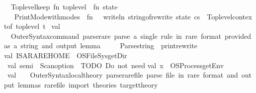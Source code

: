 \begin{isabellebody}
\ \ Toplevel{\isachardot}{\kern0pt}keep\ {\isacharparenleft}{\kern0pt}fn\ toplevel\ {\isacharequal}{\kern0pt}{\isachargreater}{\kern0pt}\ {\isacharparenleft}{\kern0pt}fn\ state\ {\isacharequal}{\kern0pt}{\isachargreater}{\kern0pt}\isanewline
\ \ \ Print{\isacharunderscore}{\kern0pt}Mode{\isachardot}{\kern0pt}with{\isacharunderscore}{\kern0pt}modes\ {\isacharbrackleft}{\kern0pt}{\isacharbrackright}{\kern0pt}\ {\isacharparenleft}{\kern0pt}fn\ {\isacharparenleft}{\kern0pt}{\isacharparenright}{\kern0pt}\ {\isacharequal}{\kern0pt}{\isachargreater}{\kern0pt}\ writeln\ {\isacharparenleft}{\kern0pt}string{\isacharunderscore}{\kern0pt}of{\isacharunderscore}{\kern0pt}rewrite\ state\ cs{\isacharparenright}{\kern0pt}{\isacharparenright}{\kern0pt}\ {\isacharparenleft}{\kern0pt}{\isacharparenright}{\kern0pt}{\isacharparenright}{\kern0pt}\ {\isacharparenleft}{\kern0pt}Toplevel{\isachardot}{\kern0pt}context{\isacharunderscore}{\kern0pt}of\ toplevel{\isacharparenright}{\kern0pt}{\isacharparenright}{\kern0pt}\ t\isanewline
\isanewline
\ val\ {\isacharunderscore}{\kern0pt}\ {\isacharequal}{\kern0pt}\isanewline
\ \ Outer{\isacharunderscore}{\kern0pt}Syntax{\isachardot}{\kern0pt}command\ \isactrlcommandUNDERSCOREkeyword {\isasymopen}parse{\isacharunderscore}{\kern0pt}rare{\isasymclose}\ {\isachardoublequote}{\kern0pt}parse\ a\ single\ rule\ in\ rare\ format\ {\isacharparenleft}{\kern0pt}provided\ as\ a\ string{\isacharparenright}{\kern0pt}\ and\ output\ lemma{\isachardoublequote}{\kern0pt}\isanewline
\ \ \ \ {\isacharparenleft}{\kern0pt}\ Parse{\isachardot}{\kern0pt}string\ {\isachargreater}{\kern0pt}{\isachargreater}{\kern0pt}\ print{\isacharunderscore}{\kern0pt}rewrite{\isacharparenright}{\kern0pt}{\isacharsemicolon}{\kern0pt}\isanewline
\isanewline
val\ ISARARE{\isacharunderscore}{\kern0pt}HOME\ {\isacharequal}{\kern0pt}\ OS{\isachardot}{\kern0pt}FileSys{\isachardot}{\kern0pt}getDir{\isacharparenleft}{\kern0pt}{\isacharparenright}{\kern0pt}\isanewline
\isanewline
\ val\ semi\ {\isacharequal}{\kern0pt}\ Scan{\isachardot}{\kern0pt}option\ \isactrlkeyword {\isasymopen}{\isacharsemicolon}{\kern0pt}{\isasymclose}{\isacharsemicolon}{\kern0pt}\ {\isacharparenleft}{\kern0pt}{\isacharasterisk}{\kern0pt}TODO{\isacharcolon}{\kern0pt}\ Do\ not\ need{\isacharquery}{\kern0pt}{\isacharasterisk}{\kern0pt}{\isacharparenright}{\kern0pt}\isanewline
val\ x\ {\isacharequal}{\kern0pt}\ OS{\isachardot}{\kern0pt}Process{\isachardot}{\kern0pt}getEnv\isanewline
\isanewline
\ val\ {\isacharunderscore}{\kern0pt}\ {\isacharequal}{\kern0pt}\ \ Outer{\isacharunderscore}{\kern0pt}Syntax{\isachardot}{\kern0pt}local{\isacharunderscore}{\kern0pt}theory\ \isactrlcommandUNDERSCOREkeyword {\isasymopen}parse{\isacharunderscore}{\kern0pt}rare{\isacharunderscore}{\kern0pt}file{\isasymclose}\ {\isachardoublequote}{\kern0pt}parse\ file\ in\ rare\ format\ and\ output\ lemmas{\isachardot}{\kern0pt}\ {\isacharless}{\kern0pt}rare{\isacharunderscore}{\kern0pt}file{\isacharcomma}{\kern0pt}\ import\ theories{\isacharcomma}{\kern0pt}\ target{\isacharunderscore}{\kern0pt}theory{\isachargreater}{\kern0pt}{\isachardoublequote}{\kern0pt}\isanewline

\end{isabellebody}

